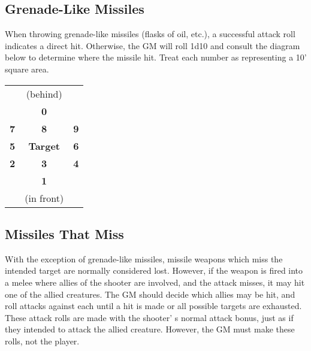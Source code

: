\documentclass[a4paper,twoside,openany,10pt]{book}
\begin{document}
\begin{multicols}{2}
\subsection{Grenade-Like Missiles}\label{grenade-like-missiles}

When throwing grenade-like missiles (flasks of oil, etc.), a successful attack roll indicates a direct hit. Otherwise, the GM will roll 1d10 and consult the diagram below to determine where the missile hit. Treat each number as representing a 10' square area.

\begin{center}
	\begin{tabular}{lcl}
	&(behind)&\\\cmidrule(lr){2-2}
	& \cellcolor[HTML]{C0C0C0}\textbf{0} & \\ \cmidrule(lr){2-2}
	\cellcolor[HTML]{C0C0C0}\textbf{7}&\cellcolor[HTML]{C0C0C0}\textbf{8}&\cellcolor[HTML]{C0C0C0}\textbf{9}\\\cmidrule(lr){1-1}\cmidrule(lr){2-2}\cmidrule(lr){3-3}
	\cellcolor[HTML]{C0C0C0}\textbf{5}&\textbf{Target}&\cellcolor[HTML]{C0C0C0}\textbf{6}\\\cmidrule(lr){1-1}\cmidrule(lr){2-2}\cmidrule(lr){3-3}
	\cellcolor[HTML]{C0C0C0}\textbf{2}&\cellcolor[HTML]{C0C0C0}\textbf{3}&\cellcolor[HTML]{C0C0C0}\textbf{4}\\\cmidrule(lr){1-1}\cmidrule(lr){2-2}\cmidrule(lr){3-3}
	&\cellcolor[HTML]{C0C0C0}\textbf{1}&\\\cmidrule(lr){2-2}
	&(in front)&\\
\end{tabular}
\end{center}

\subsection{Missiles That Miss}\label{missiles-that-miss} 

With the exception of grenade-like missiles, missile weapons which miss the intended target are normally considered lost. However, if the weapon is fired into a melee where allies of the shooter are involved, and the attack misses, it may hit one of the allied creatures. The GM should decide which allies may be hit, and roll attacks against each until a hit is made or all possible targets are exhausted. These attack rolls are made with the shooter' s normal attack bonus, just as if they intended to attack the allied creature. However, the GM must make these rolls, not the player.


\end{multicols}
\end{document}
